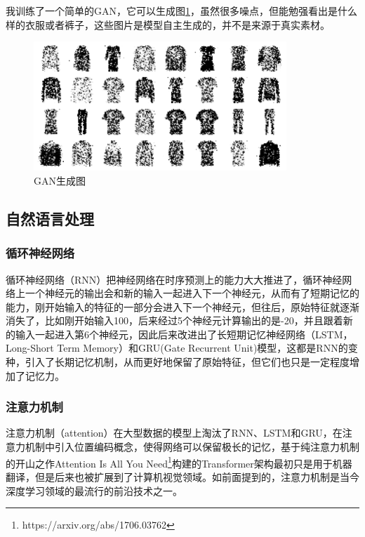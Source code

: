 \documentclass[a5paper, 11pt]{ctexbook}
\begin{document}
我训练了一个简单的GAN，它可以生成图\ref{GAN生成图}，虽然很多噪点，但能勉强看出是什么样的衣服或者裤子，这些图片是模型自主生成的，并不是来源于真实素材。

\begin{figure}
    \centering
    \includegraphics[width=0.85\textwidth]{figures/GAN生成图.png}
    \caption{GAN生成图}
    \label{GAN生成图}
\end{figure}

\subsection{自然语言处理}

\subsubsection{循环神经网络}
循环神经网络（RNN）把神经网络在时序预测上的能力大大推进了，循环神经网络上一个神经元的输出会和新的输入一起进入下一个神经元，从而有了短期记忆的能力，刚开始输入的特征的一部分会进入下一个神经元，但往后，原始特征就逐渐消失了，比如刚开始输入100，后来经过5个神经元计算输出的是-20，并且跟着新的输入一起进入第6个神经元，因此后来改进出了长短期记忆神经网络（LSTM，Long-Short Term Memory）和GRU(Gate Recurrent Unit)模型，这都是RNN的变种，引入了长期记忆机制，从而更好地保留了原始特征，但它们也只是一定程度增加了记忆力。

\subsubsection{注意力机制}


\begin{sloppypar}
    注意力机制（attention）在大型数据的模型上淘汰了RNN、LSTM和GRU，在注意力机制中引入位置编码概念，使得网络可以保留极长的记忆，基于纯注意力机制的开山之作Attention Is All You Need\footnote{https://arxiv.org/abs/1706.03762}构建的Transformer架构最初只是用于机器翻译，但是后来也被扩展到了计算机视觉领域。如前面提到的，注意力机制是当今深度学习领域的最流行的前沿技术之一。
\end{sloppypar}
\end{document}
